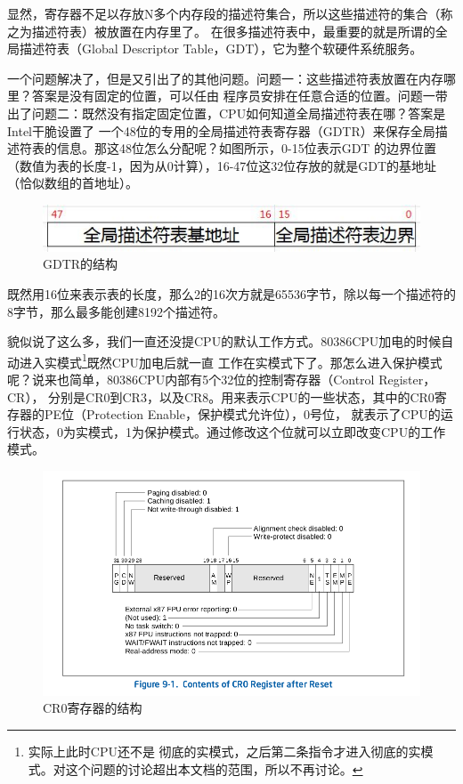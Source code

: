  \par 显然，寄存器不足以存放N多个内存段的描述符集合，所以这些描述符的集合（称之为描述符表）被放置在内存里了。\allowbreak
 在很多描述符表中，最重要的就是所谓的全局描述符表（Global Descriptor Table，GDT），它为整个软硬件系统服务。

 \par 一个问题解决了，但是又引出了的其他问题。问题一：这些描述符表放置在内存哪里？答案是没有固定的位置，可以任由\allowbreak
 程序员安排在任意合适的位置。问题一带出了问题二：既然没有指定固定位置，CPU如何知道全局描述符表在哪？答案是Intel干脆设置了\allowbreak
 一个48位的专用的全局描述符表寄存器（GDTR）来保存全局描述符表的信息。那这48位怎么分配呢？如图所示，0-15位表示GDT\allowbreak
 的边界位置（数值为表的长度-1，因为从0计算），16-47位这32位存放的就是GDT的基地址（恰似数组的首地址）。

\begin{figure}[ht]
      \centering
      \includegraphics[scale=0.5]{picture/chapt6/gdtr.png}
      \caption{GDTR的结构}
\end{figure}

\par 既然用16位来表示表的长度，那么2的16次方就是65536字节，除以每一个描述符的8字节，那么最多能创建8192个描述符。

\par 貌似说了这么多，我们一直还没提CPU的默认工作方式。80386CPU加电的时候自动进入实模式\footnote{实际上此时CPU还不是\allowbreak
彻底的实模式，之后第二条指令才进入彻底的实模式。对这个问题的讨论超出本文档的范围，所以不再讨论。}既然CPU加电后就一直\allowbreak
工作在实模式下了。那怎么进入保护模式呢？说来也简单，80386CPU内部有5个32位的控制寄存器（Control Register，CR），\allowbreak
分别是CR0到CR3，以及CR8。用来表示CPU的一些状态，其中的CR0寄存器的PE位（Protection Enable，保护模式允许位），0号位，\allowbreak
就表示了CPU的运行状态，0为实模式，1为保护模式。通过修改这个位就可以立即改变CPU的工作模式。

\begin{figure}[ht]
      \centering
      \includegraphics[scale=0.5]{picture/chapt6/cr0.png}
      \caption{CR0寄存器的结构}
\end{figure}

